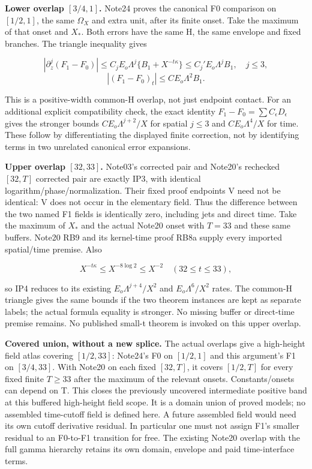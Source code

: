 \textbf{Lower overlap \([3/4,1]\).} Note24 proves the canonical F0 comparison on \([1/2,1]\), the same \(\Omega_{X}\) and extra unit, after its finite onset. Take the maximum of that onset and \(X_*.\) Both errors have the same H, the same envelope and fixed branches. The triangle inequality gives

\[
|\partial_z^j(F_1-F_0)|\le C_jE_o\Lambda^j
 \{B_1+X^{-t\kappa}\}\le C_j'E_o\Lambda^jB_1,\quad j\le3,
\]
\[
|(F_1-F_0)_t|\le C E_o\Lambda^2B_1.
\tag{IP30}\label{eq:ansatz-ip30}
\]

This is a positive-width common-H overlap, not just endpoint contact. For an additional explicit compatibility check, the exact identity \(F_{1}-F_{0}=\sum C_{\epsilon} D_{\epsilon}\) gives the stronger bounds \(C E_{o} \Lambda^{j+2}/X\) for spatial \(j\le 3\) and \(C E_{o} \Lambda^{4}/X\) for time. These follow by differentiating the displayed finite correction, not by identifying terms in two unrelated canonical error expansions.

\textbf{Upper overlap \([32,33]\).} Note03's corrected pair and Note20's rechecked \([32,T]\) corrected pair are exactly IP3, with identical logarithm/phase/normalization. Their fixed proof endpoints V need not be identical: V does not occur in the elementary field. Thus the difference between the two named F1 fields is identically zero, including jets and direct time. Take the maximum of \(X_*\) and the actual Note20 onset with \(T=33\) and these same buffers. Note20 RB9 and its kernel-time proof RB8a supply every imported spatial/time premise. Also

\[
X^{-t\kappa}\le X^{-8\log2}\le X^{-2}
\quad(32\le t\le33),
\tag{IP31}\label{eq:ansatz-ip31}
\]

so IP4 reduces to its existing \(E_{o} \Lambda^{j+4}/X^{2}\) and \(E_{o} \Lambda^{6}/X^{2}\) rates. The common-H triangle gives the same bounds if the two theorem instances are kept as separate labels; the actual formula equality is stronger. No missing buffer or direct-time premise remains. No published small-t theorem is invoked on this upper overlap.

\textbf{Covered union, without a new splice.} The actual overlaps give a high-height field atlas covering \([1/2,33]\): Note24's F0 on \([1/2,1]\) and this argument's F1 on \([3/4,33]\). With Note20 on each fixed \([32,T]\), it covers \([1/2,T]\) for every fixed finite \(T\ge 33\) after the maximum of the relevant onsets. Constants/onsets can depend on T. This closes the previously uncovered intermediate positive band at this buffered high-height field scope. It is a domain union of proved models; no assembled time-cutoff field is defined here. A future assembled field would need its own cutoff derivative residual. In particular one must not assign F1's smaller residual to an F0-to-F1 transition for free. The existing Note20 overlap with the full gamma hierarchy retains its own domain, envelope and paid time-interface terms.

